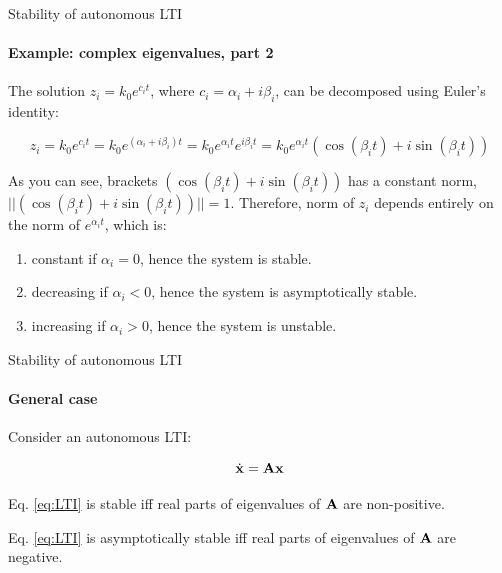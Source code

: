 \documentclass{beamer}
\begin{document}
\begin{frame}{Stability of autonomous LTI}
\framesubtitle{Example: complex eigenvalues, part 2}
\begin{flushleft}

The solution $z_i = k_0 e^{c_i t}$, where $c_i = \alpha_i + i \beta_i$, can be decomposed using Euler's identity:

\[
    z_i = k_0 e^{c_i t} =
    k_0 e^{(\alpha_i + i \beta_i) t} =
    k_0 e^{\alpha_i t} 
          e^{i \beta_i t} = 
    k_0 e^{\alpha_i t} 
    (\cos(\beta_i t) + i \sin(\beta_i t))
\]

As you can see, brackets $(\cos(\beta_i t) + i \sin(\beta_i t))$ has a constant norm, $|| (\cos(\beta_i t) + i \sin(\beta_i t)) || = 1$. Therefore, norm of $z_i$ depends entirely on the norm of $e^{\alpha_i t}$, which is:

\begin{enumerate}
    \item constant if $\alpha_i = 0$, hence the system is stable. 
    \item decreasing if $\alpha_i < 0$, hence the system is asymptotically stable. 
    \item increasing if $\alpha_i > 0$, hence the system is unstable. 
\end{enumerate}



\end{flushleft}
\end{frame}




\begin{frame}{Stability of autonomous LTI}
\framesubtitle{General case}
\begin{flushleft}

Consider an autonomous LTI:

\begin{equation}
\label{eq:LTI}
    \dot{\mathbf{x}} = \mathbf{A} \mathbf{x}
\end{equation}

\begin{definition}
Eq. \eqref{eq:LTI} is stable iff real parts of eigenvalues of $\mathbf{A}$ are non-positive.
\end{definition}

\begin{definition}
Eq. \eqref{eq:LTI} is asymptotically stable iff real parts of eigenvalues of $\mathbf{A}$ are negative.
\end{definition}

\end{flushleft}
\end{frame}
\end{document}
